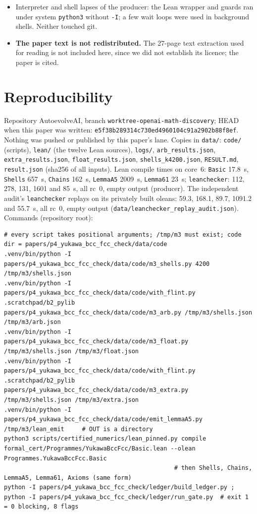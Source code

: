 \documentclass[11pt]{article}
\newcommand{\lean}[1]{\texttt{#1}}
\begin{document}
\begin{itemize}
\item Interpreter and shell lapses of the producer: the Lean wrapper and guards ran under system \texttt{python3} without \texttt{-I}; a few wait loops were used in background shells. Neither touched git.
\item \textbf{The paper text is not redistributed.} The 27-page text extraction used for reading is not included here, since we did not establish its licence; the paper is cited.
\end{itemize}

\section{Reproducibility}\label{sec:repro}
Repository AutoevolveAI, branch \texttt{worktree-openai-math-discovery}; HEAD when this paper was written: \texttt{e5f38b289314c730ed4960104c91a2902b88f8ef}. Nothing was pushed or published by this paper's lane. Copies in \texttt{data/}: \texttt{code/} (scripts), \texttt{lean/} (the twelve Lean sources), \texttt{logs/}, \texttt{arb\_results.json}, \texttt{extra\_results.json}, \texttt{float\_results.json}, \texttt{shells\_k4200.json}, \texttt{RESULT.md}, \texttt{result.json} (sha256 of all inputs). Lean compile times on core~6: \lean{Basic} 17.8~s, \lean{Shells} 657~s, \lean{Chains} 162~s, \lean{LemmaA5} 2009~s, \lean{Lemma61} 23~s; \texttt{leanchecker}: 112, 278, 131, 1601 and 85~s, all rc~0, empty output (producer). The independent audit's \texttt{leanchecker} replays on its privately built oleans: 59.3, 168.1, 89.7, 1091.2 and 55.7~s, all rc~0, empty output (\texttt{data/leanchecker\_replay\_audit.json}). Commands (repository root):
\begin{lstlisting}[basicstyle=\ttfamily\scriptsize]
# every script takes positional arguments; /tmp/m3 must exist; code dir = papers/p4_yukawa_bcc_fcc_check/data/code
.venv/bin/python -I papers/p4_yukawa_bcc_fcc_check/data/code/m3_shells.py 4200 /tmp/m3/shells.json
.venv/bin/python -I papers/p4_yukawa_bcc_fcc_check/data/code/with_flint.py .scratchpad/b2_pylib papers/p4_yukawa_bcc_fcc_check/data/code/m3_arb.py /tmp/m3/shells.json /tmp/m3/arb.json
.venv/bin/python -I papers/p4_yukawa_bcc_fcc_check/data/code/m3_float.py /tmp/m3/shells.json /tmp/m3/float.json
.venv/bin/python -I papers/p4_yukawa_bcc_fcc_check/data/code/with_flint.py .scratchpad/b2_pylib papers/p4_yukawa_bcc_fcc_check/data/code/m3_extra.py /tmp/m3/shells.json /tmp/m3/extra.json
.venv/bin/python -I papers/p4_yukawa_bcc_fcc_check/data/code/emit_lemmaA5.py /tmp/m3/lean_emit     # OUT is a directory
python3 scripts/certified_numerics/lean_pinned.py compile formal_cert/Programmes/YukawaBccFcc/Basic.lean --olean Programmes.YukawaBccFcc.Basic
                                                # then Shells, Chains, LemmaA5, Lemma61, Axioms (same form)
python -I papers/p4_yukawa_bcc_fcc_check/ledger/build_ledger.py ; python -I papers/p4_yukawa_bcc_fcc_check/ledger/run_gate.py  # exit 1 = 0 blocking, 8 flags
\end{lstlisting}
\end{document}
